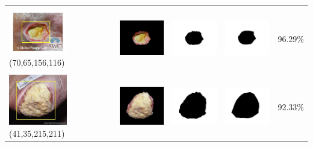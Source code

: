 \begin{table}[H]
\begin{tabular}{|m{1.0in}|m{1.0in}|m{1.0in}|m{1.0in}|m{0.6in}|}
		&  &  & \\
		\includegraphics[width=1.0in]{gambar/hasil_segmentasi/luka_kuning/image_34_rect.jpg} {\centering\fontsize{10}{10}\selectfont(70,65,156,116)}&
		\includegraphics[width=1.0in]{gambar/hasil_segmentasi/luka_kuning/result_34.jpg}&
		\includegraphics[width=1.0in]{gambar/hasil_segmentasi/luka_kuning/mask_r_34.jpg}&
		\includegraphics[width=1.0in]{gambar/hasil_segmentasi/luka_kuning/34_r.jpg}&
		96.29\% \\
		\hline

		&  &  & \\
		\includegraphics[width=1.0in]{gambar/hasil_segmentasi/luka_kuning/image_35_rect.jpg} {\centering\fontsize{10}{10}\selectfont(41,35,215,211)}&
		\includegraphics[width=1.0in]{gambar/hasil_segmentasi/luka_kuning/result_35.jpg}&
		\includegraphics[width=1.0in]{gambar/hasil_segmentasi/luka_kuning/mask_r_35.jpg}&
		\includegraphics[width=1.0in]{gambar/hasil_segmentasi/luka_kuning/35_r.jpg}&
		92.33\% \\
		\hline


\end{tabular}
\end{table}
